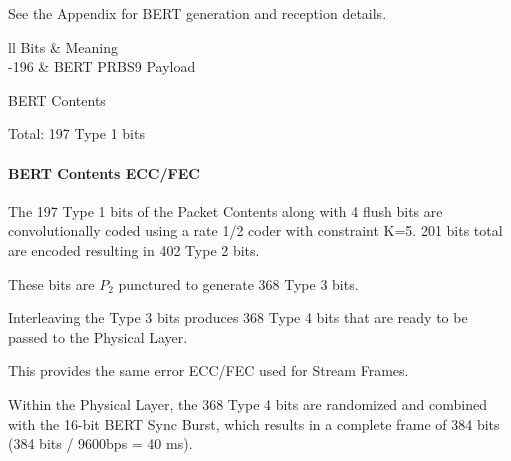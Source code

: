 \documentclass[a4paper,11pt,oneside]{book}
\begin{document}
See the Appendix for BERT generation and reception details.

\begin{table}[H]
	\centering
	\begin{tblr}{ll}
		\hline
		Bits & Meaning \\
		-196 & BERT PRBS9 Payload \\
		\hline[2px]
	\end{tblr}
	\caption{BERT Contents}
\end{table}

Total: 197 Type 1 bits

\paragraph{BERT Contents ECC/FEC}

The 197 Type 1 bits of the Packet Contents along with 4 flush bits are convolutionally coded using a rate 1/2 coder with constraint K=5. 201 bits total are encoded resulting in 402 Type 2 bits.

These bits are $P_2$ punctured to generate 368 Type 3 bits.

Interleaving the Type 3 bits produces 368 Type 4 bits that are ready to be passed to the Physical Layer.

This provides the same error ECC/FEC used for Stream Frames.

Within the Physical Layer, the 368 Type 4 bits are randomized and combined with the 16-bit BERT Sync Burst, which results in a complete frame of 384 bits (384 bits / 9600bps = 40 ms).
\end{document}
